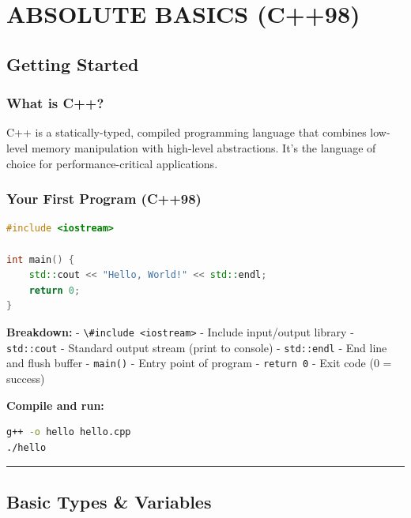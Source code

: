 \hypertarget{absolute-basics-c98}{%
\chapter{ABSOLUTE BASICS (C++98)}\label{absolute-basics-c98}}

\hypertarget{getting-started}{%
\section{Getting Started}\label{getting-started}}

\hypertarget{what-is-c}{%
\subsection{What is C++?}\label{what-is-c}}

C++ is a statically-typed, compiled programming language that combines
low-level memory manipulation with high-level abstractions. It's the
language of choice for performance-critical applications.

\hypertarget{your-first-program-c98}{%
\subsection{Your First Program (C++98)}\label{your-first-program-c98}}

\begin{lstlisting}[language={C++}]
#include <iostream>

int main() {
    std::cout << "Hello, World!" << std::endl;
    return 0;
}
\end{lstlisting}

\textbf{Breakdown:} - \passthrough{\lstinline!\#include <iostream>!} -
Include input/output library - \passthrough{\lstinline!std::cout!} -
Standard output stream (print to console) -
\passthrough{\lstinline!std::endl!} - End line and flush buffer -
\passthrough{\lstinline!main()!} - Entry point of program -
\passthrough{\lstinline!return 0!} - Exit code (0 = success)

\textbf{Compile and run:}

\begin{lstlisting}[language=bash]
g++ -o hello hello.cpp
./hello
\end{lstlisting}

\begin{center}\rule{0.5\linewidth}{0.5pt}\end{center}

\hypertarget{basic-types-variables}{%
\section{Basic Types \& Variables}\label{basic-types-variables}}

